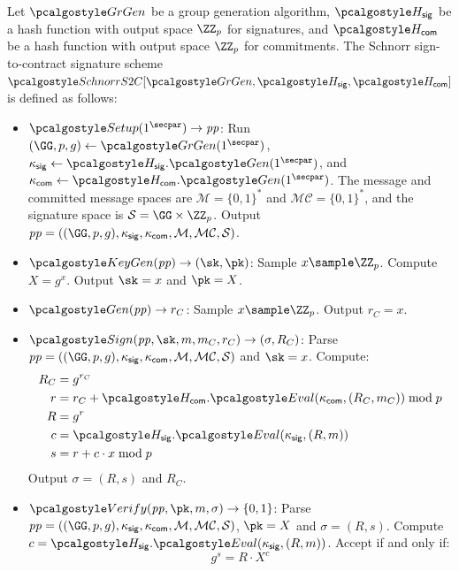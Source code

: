 \begin{definition}\label{def:schnorr-s2c}
  Let $\grgen$ be a group generation algorithm, $\algo{H}_{\mathsf{sig}}$ be a hash function with output space $\ZZ_p$ for signatures, and $\algo{H}_{\mathsf{com}}$ be a hash function with output space $\ZZ_p$ for commitments. The Schnorr sign-to-contract signature scheme $\algo{SchnorrS2C}[\grgen, \algo{H}_{\mathsf{sig}}, \algo{H}_{\mathsf{com}}]$ is defined as follows:
  \begin{itemize}
    \item $\algo{Setup}(1^\secpar) \rightarrow \params$: Run $\gparam \gets \grgen(1^\secpar)$, $\kappa_{\mathsf{sig}} \gets \algo{H}_{\mathsf{sig}}.\algo{Gen}(1^\secpar)$, and $\kappa_{\mathsf{com}} \gets \algo{H}_{\mathsf{com}}.\algo{Gen}(1^\secpar)$. The message and committed message spaces are $\mathcal{M} = \{0,1\}^*$ and $\mathcal{MC} = \{0,1\}^*$, and the signature space is $\mathcal{S} = \GG \times \ZZ_p$. Output $\params = (\gparam, \kappa_{\mathsf{sig}}, \kappa_{\mathsf{com}}, \mathcal{M}, \mathcal{MC}, \mathcal{S})$.
    
    \item $\algo{KeyGen}(\params) \rightarrow (\sk, \pk)$: Sample $x \sample \ZZ_p$. Compute $X = g^x$. Output $\sk = x$ and $\pk = X$.
    
    \item $\algo{Gen}(\params) \rightarrow r_C$: Sample $x \sample \ZZ_p$. Output $r_C = x$.

    \item $\algo{Sign}(\params, \sk, m, m_C, r_C) \rightarrow (\sigma, R_C)$: Parse $\params = (\gparam, \kappa_{\mathsf{sig}}, \kappa_{\mathsf{com}}, \mathcal{M}, \mathcal{MC}, \mathcal{S})$ and $\sk = x$. Compute:
    \begin{align*}
      R_C &= g^{r_C} \\
      r &= r_C + \algo{H}_{\mathsf{com}}.\algo{Eval}(\kappa_{\mathsf{com}}, (R_C, m_C))  \bmod p\\
      R &= g^r \\
      c &= \algo{H}_{\mathsf{sig}}.\algo{Eval}(\kappa_{\mathsf{sig}}, (R, m)) \\
      s &= r + c \cdot x \bmod p
    \end{align*}
    Output $\sigma = (R, s)$ and $R_C$.
    
    \item $\algo{Verify}(\params, \pk, m, \sigma) \rightarrow \{0, 1\}$: Parse $\params = (\gparam, \kappa_{\mathsf{sig}}, \kappa_{\mathsf{com}}, \mathcal{M}, \mathcal{MC}, \mathcal{S})$, $\pk = X$ and $\sigma = (R, s)$. Compute $c = \algo{H}_{\mathsf{sig}}.\algo{Eval}(\kappa_{\mathsf{sig}}, (R, m))$. Accept if and only if:
    \[
      g^s = R \cdot X^c
    \]


\end{itemize}
\end{definition}
